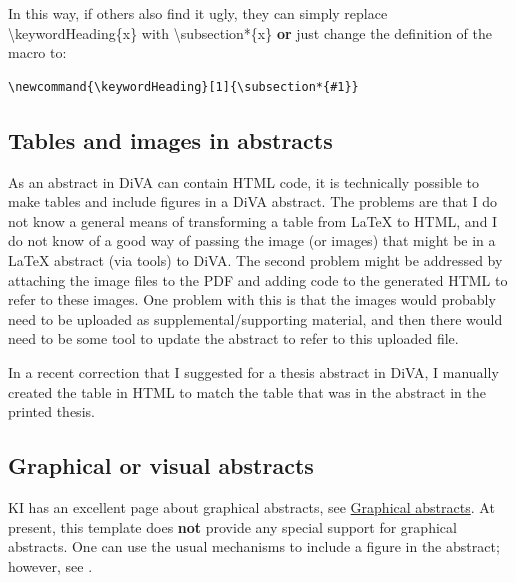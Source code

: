 \documentclass[12pt, twoside]{article}
\begin{document}
In this way, if others also find it ugly, they can simply replace \textbackslash keywordHeading\{x\} with \textbackslash subsection*\{x\} \textbf{or} just change the definition of the macro to:
\begin{lstlisting}[style=latexExampleForAuthors]
\newcommand{\keywordHeading}[1]{\subsection*{#1}}
\end{lstlisting}

\subsection{Tables and images in abstracts}
\label{sec:cycle3TablesAndImagesInAbstracts}

As an abstract in \gls{DiVA} can contain \gls{HTML} code, it is technically possible to make tables and include figures in a \gls{DiVA} abstract. The problems are \first that I do not know a general means of transforming a table from LaTeX to \gls{HTML}, and \Second I do not know of a good way of passing the image (or images) that might be in a LaTeX abstract (via tools) to \gls{DiVA}. The second problem might be addressed by attaching the image files to the PDF and adding code to the generated \gls{HTML} to refer to these images. One problem with this is that the images would probably need to be uploaded as supplemental/supporting material, and then there would need to be some tool to update the abstract to refer to this uploaded file.

In a recent correction that I suggested for a thesis abstract in \gls{DiVA}, I manually created the table in \gls{HTML} to match the table that was in the abstract in the printed thesis.

\subsection{Graphical or visual abstracts}
\label{sec:cycle3GraphicalAbstracts}

KI has an excellent page about graphical abstracts, see \href{https://kib.ki.se/en/visualise-present/visualising-data/graphical-abstracts}{Graphical abstracts}. At present, this template does \textbf{not} provide any special support for graphical abstracts. One can use the usual mechanisms to include a figure in the abstract; however, see .
\end{document}
